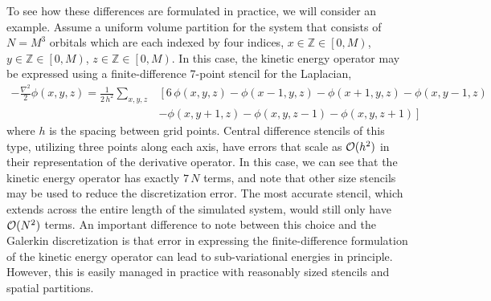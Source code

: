 \documentclass[superscriptaddress,aps,pra,nofootinbib,notitlepage,10pt,longbibliography]{revtex4-1}
\begin{document}
To see how these differences are formulated in practice, we will consider an example.  Assume a uniform volume partition for the system that consists of $N = M^3 $ orbitals which are each indexed by four indices, $x \in \mathbb{Z} \in \left[0, M \right)$, $y \in \mathbb{Z} \in \left[0, M \right)$, $z \in \mathbb{Z} \in \left[0, M \right)$. In this case, the kinetic energy operator may be expressed using a finite-difference 7-point stencil for the Laplacian,
\begin{align}
- \frac{\nabla^2}{2} \phi(x,y,z) = \frac{1}{2\,h^2} \sum_{x,y,z} & \left[ 6\, \phi{(x,y,z)} - \phi(x-1,y,z) - \phi(x + 1,y,z) - \phi(x,y - 1,z) \right. \\
& \left. - \phi(x,y + 1,z)
- \phi(x,y,z-1) - \phi(x,y,z+1) \right]\nonumber
\end{align}
where $h$ is the spacing between grid points.  Central difference stencils of this type, utilizing three points along each axis, have errors that scale as ${\cal O}(h^2)$ in their representation of the derivative operator. In this case, we can see that the kinetic energy operator has exactly $ 7\, N $ terms, and note that other size stencils may be used to reduce the discretization error. The most accurate stencil, which extends across the entire length of the simulated system, would still only have ${\cal O}(N^2)$ terms. An important difference to note between this choice and the Galerkin discretization is that error in expressing the finite-difference formulation of the kinetic energy operator can lead to sub-variational energies in principle. However, this is easily managed in practice with reasonably sized stencils and spatial partitions.
\end{document}
